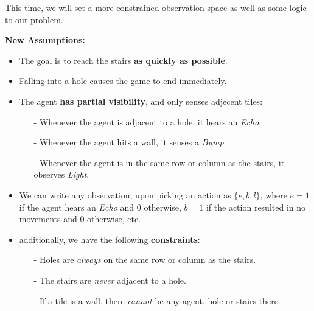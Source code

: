 \documentclass[11pt]{article}
\numberwithin{equation}{section}
\begin{document}
This time, we will set a more constrained observation space as well as some logic to our problem.

\textbf{New Assumptions:}
\begin{itemize}
    \item {\color{gray} The goal is to reach the stairs \textbf{as quickly as possible}.}
    \item {\color{gray} Falling into a hole causes the game to end immediately.}
    \item The agent \textbf{has partial visibility}, and only senses adjecent tiles:
    \begin{itemize}
        \item[-]  Whenever the agent is adjacent to a hole, it hears an \emph{Echo}.
        \item[-]  Whenever the agent hits a wall, it senses a \emph{Bump}.
        \item[-]  Whenever the agent is in the same row or column as the stairs, it observes \emph{Light}.
    \end{itemize}
    \item We can write any observation, upon picking an action as $\{e, b, l\}$, where $e=1$ if the agent hears an \emph{Echo} and 0 otherwise,  $b=1$ if the action resulted in no movements and 0 otherwise, etc.

    \item additionally, we have the following \textbf{constraints}:
    \begin{itemize}
        \item[-]  Holes are \emph{always} on the same row or column as the stairs.
        \item[-]  The stairs are \emph{never} adjacent to a hole.
        \item[-]  If a tile is a wall, there \emph{cannot} be any agent, hole or stairs there.
    \end{itemize}
\end{itemize}
\end{document}
